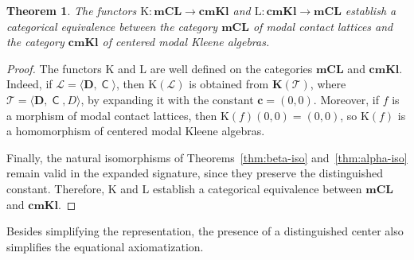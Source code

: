 \documentclass{article}
\newtheorem{theorem}{Theorem}[section]
\DeclareMathOperator{\con}{\mathsf{C}}
\newcommand{\cbf}{\mathbf{c}}
\newcommand{\D}{\mathbf{D}}
\begin{document}
\begin{theorem}
    The functors $\mathrm{K}:\mathbf{mCL}\longrightarrow\mathbf{cmKl}$ and $\mathrm{L}:\mathbf{cmKl}\longrightarrow\mathbf{mCL}$ establish a categorical equivalence between the category $\mathbf{mCL}$ of modal contact lattices and the category $\mathbf{cmKl}$ of centered modal Kleene algebras.
\end{theorem}
\begin{proof}
The functors $\mathrm{K}$ and $\mathrm{L}$ are well defined on the categories
$\mathbf{mCL}$ and $\mathbf{cmKl}$. Indeed, if
$\mathcal{L}=\langle\D,\con\rangle$, then
$\mathrm{K}(\mathcal{L})$ is obtained from
$\mathbf{K}(\mathcal{T})$, where
$\mathcal{T}=\langle\D,\con,D\rangle$, by expanding it with the constant
$\cbf=(0,0)$. Moreover, if $f$ is a morphism of modal contact lattices, then
$\mathrm{K}(f)(0,0)=(0,0)$,
so $\mathrm{K}(f)$ is a homomorphism of centered modal Kleene algebras.

Finally, the natural isomorphisms of
Theorems~\ref{thm:beta-iso} and~\ref{thm:alpha-iso}
remain valid in the expanded signature, since they preserve the distinguished
constant. Therefore, $\mathrm{K}$ and $\mathrm{L}$ establish a categorical
equivalence between $\mathbf{mCL}$ and $\mathbf{cmKl}$.
\end{proof}

Besides simplifying the representation, the presence of a distinguished center also simplifies the equational axiomatization. 
\end{document}
